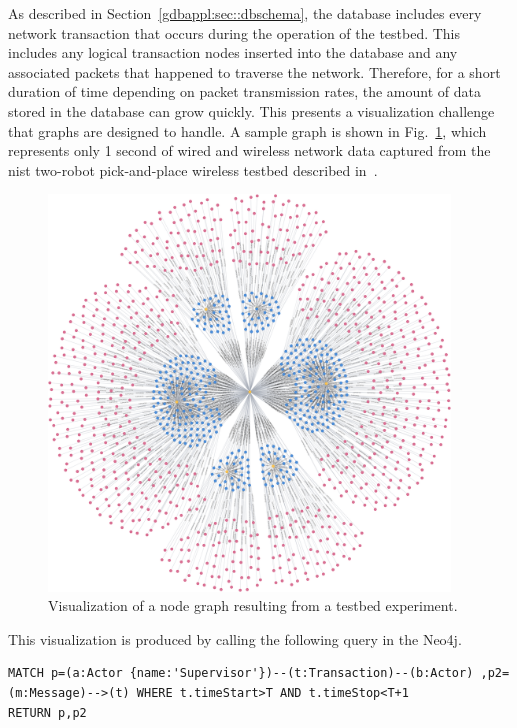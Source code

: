 As described in Section~\ref{gdbappl:sec::dbschema}, the database includes every network transaction that occurs during the operation of the testbed.  This includes any logical transaction nodes inserted into the database and any associated packets that happened to traverse the network.  Therefore, for a short duration of time depending on packet transmission rates, the amount of data stored in the database can grow quickly. This presents a visualization challenge that graphs are designed to handle. A sample graph is shown in Fig.~\ref{gdbappl:fig::Sample-graph_1}, which represents only 1 second of wired and wireless network data captured from the \gls{nist} two-robot pick-and-place wireless testbed described in~\cite{Liu2019vancouver}. 

\begin{figure}[!ht]
    \centering
   \includegraphics[width=0.95\textwidth]{./chapter-gdb-appl/figures/database/graph_M_T_2.png}
   \vspace{0.1in}
    \caption{ Visualization of a node graph resulting from a testbed experiment. }
    \label{gdbappl:fig::Sample-graph_1}
    \vspace{0.1in}
\end{figure}

This visualization is produced by calling the following query in the Neo4j. 
\begin{lstlisting}
MATCH p=(a:Actor {name:'Supervisor'})--(t:Transaction)--(b:Actor) ,p2=(m:Message)-->(t) WHERE t.timeStart>T AND t.timeStop<T+1
RETURN p,p2
\end{lstlisting}

